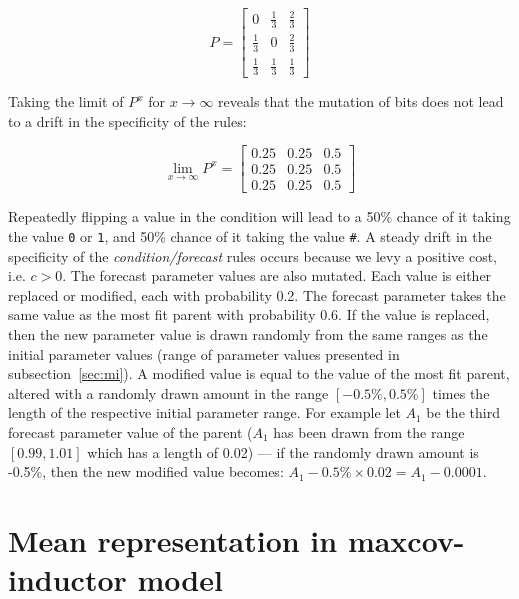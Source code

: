 \documentclass[preprint, 12pt]{elsarticle}
\begin{document}
\begin{equation}
P = \left[ {\begin{array}{*{20}{c}} 0&{\frac{1}{3}}&{\frac{2}{3}} \\ {\frac{1}{3}}&0&{\frac{2}{3}} \\ {\frac{1}{3}}&{\frac{1}{3}}&{\frac{1}{3}} \end{array}} \right]
\end{equation}

Taking the limit of $P^x$ for $x \to \infty$ reveals that the mutation of bits does not lead to a drift in the specificity of the rules:

\begin{equation}
\mathop {\lim }\limits_{x \to \infty } {P^x} = \left[ {\begin{array}{*{20}{c}} {0.25}&{0.25}&{0.5} \\ {0.25}&{0.25}&{0.5} \\ {0.25}&{0.25}&{0.5} \end{array}} \right]
\end{equation}

Repeatedly flipping a value in the condition will lead to a 50\% chance of it taking the value \texttt{0} or \texttt{1}, and 50\% chance of it taking the value \texttt{\#}. A steady drift in the specificity of the \emph{condition/forecast} rules occurs because we levy a positive cost, i.e. $c > 0$. The forecast parameter values are also mutated. Each value is either replaced or modified, each with probability 0.2. The forecast parameter takes the same value as the most fit parent with probability 0.6. If the value is replaced, then the new parameter value is drawn randomly from the same ranges as the initial parameter values (range of parameter values presented in subsection~\ref{sec:mi}). A modified value is equal to the value of the most fit parent, altered with a randomly drawn amount in the range $[-0.5\%, 0.5\%]$ times the length of the respective initial parameter range. For example let $A_1$ be the third forecast parameter value of the parent ($A_1$ has been drawn from the range $[0.99, 1.01]$ which has a length of 0.02) — if the randomly drawn amount is -0.5\%, then the new modified value becomes: $A_1 - 0.5\% \times 0.02 = A_1 - 0.0001$.

\section{Mean representation in maxcov-inductor model}
\label{app:representation_mi}
\end{document}
